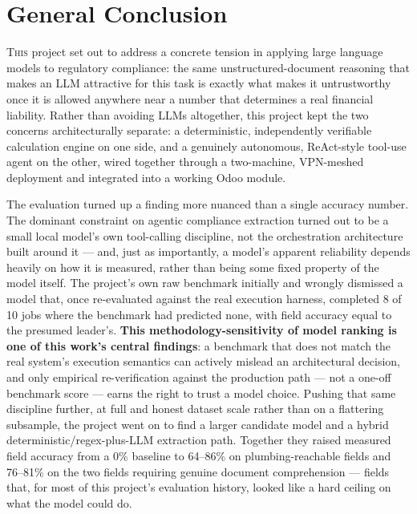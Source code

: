 \chapter*{General Conclusion}
\adjustmtc
\thispagestyle{MyStyle}

\lettrine{T}{his} project set out to address a concrete tension in
applying large language models to regulatory compliance: the same
unstructured-document reasoning that makes an LLM attractive for this
task is exactly what makes it untrustworthy once it is allowed anywhere
near a number that determines a real financial liability. Rather than
avoiding LLMs altogether, this project kept the two concerns
architecturally separate: a deterministic, independently verifiable
calculation engine on one side, and a genuinely autonomous, ReAct-style
tool-use agent on the other, wired together through a two-machine,
VPN-meshed deployment and integrated into a working Odoo module.

The evaluation turned up a finding more nuanced than a single accuracy
number. The dominant constraint on agentic compliance extraction turned
out to be a small local model's own tool-calling discipline, not the
orchestration architecture built around it --- and, just as importantly,
a model's apparent reliability depends heavily on how it is measured,
rather than being some fixed property of the model itself. The project's
own raw benchmark initially and wrongly dismissed a model that, once
re-evaluated against the real execution harness, completed 8 of 10 jobs
where the benchmark had predicted none, with field accuracy equal to the
presumed leader's. \textbf{This methodology-sensitivity of model ranking is one of
this work's central findings}: a benchmark that does not match the real
system's execution semantics can actively mislead an architectural
decision, and only empirical re-verification against the production path
--- not a one-off benchmark score --- earns the right to trust a model
choice. Pushing that same discipline further, at full and honest dataset
scale rather than on a flattering subsample, the project went on to find
a larger candidate model and a hybrid deterministic/regex-plus-LLM
extraction path. Together they raised measured field accuracy from a
0\% baseline to 64--86\% on plumbing-reachable fields and 76--81\% on the
two fields requiring genuine document comprehension --- fields that, for
most of this project's evaluation history, looked like a hard ceiling on
what the model could do.

